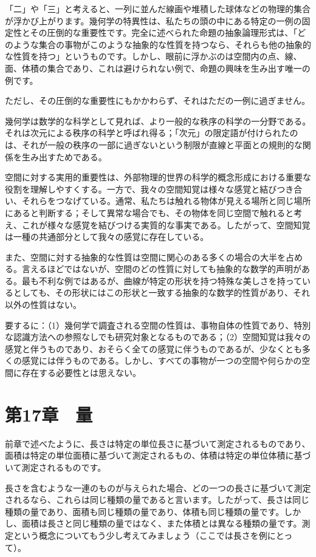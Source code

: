 \documentclass[a4paper,11pt,openany]{ltjsbook}
\begin{document}
「二」や「三」と考えると、一列に並んだ線画や堆積した球体などの物理的集合が浮かび上がります。幾何学の特異性は、私たちの頭の中にある特定の一例の固定性とその圧倒的な重要性です。完全に述べられた命題の抽象論理形式は、「どのような集合の事物がこのような抽象的な性質を持つなら、それらも他の抽象的な性質を持つ」というものです。しかし、眼前に浮かぶのは空間内の点、線、面、体積の集合であり、これは避けられない例で、命題の興味を生み出す唯一の例です。

ただし、その圧倒的な重要性にもかかわらず、それはただの一例に過ぎません。

幾何学は数学的な科学として見れば、より一般的な秩序の科学の一分野である。それは次元による秩序の科学と呼ばれ得る；「次元」の限定語が付けられたのは、それが一般の秩序の一部に過ぎないという制限が直線と平面との規則的な関係を生み出すためである。

空間に対する実用的重要性は、外部物理的世界の科学的概念形成における重要な役割を理解しやすくする。一方で、我々の空間知覚は様々な感覚と結びつき合い、それらをつなげている。通常、私たちは触れる物体が見える場所と同じ場所にあると判断する；そして異常な場合でも、その物体を同じ空間で触れると考え、これが様々な感覚を結びつける実質的な事実である。したがって、空間知覚は一種の共通部分として我々の感覚に存在している。

また、空間に対する抽象的な性質は空間に関心のある多くの場合の大半を占める。言えるほどではないが、空間のどの性質に対しても抽象的な数学的声明がある。最も不利な例ではあるが、曲線が特定の形状を持つ特殊な美しさを持っているとしても、その形状にはこの形状と一致する抽象的な数学的性質があり、それ以外の性質はない。

要するに：（1）幾何学で調査される空間の性質は、事物自体の性質であり、特別な認識方法への参照なしでも研究対象となるものである；（2）空間知覚は我々の感覚と伴うものであり、おそらく全ての感覚に伴うものであるが、少なくとも多くの感覚には伴うものである。しかし、すべての事物が一つの空間や何らかの空間に存在する必要性とは思えない。

\chapter{第17章　量}

前章で述べたように、長さは特定の単位長さに基づいて測定されるものであり、面積は特定の単位面積に基づいて測定されるもの、体積は特定の単位体積に基づいて測定されるものです。

長さを含むような一連のものが与えられた場合、どの一つの長さに基づいて測定されるなら、これらは同じ種類の量であると言います。したがって、長さは同じ種類の量であり、面積も同じ種類の量であり、体積も同じ種類の量です。しかし、面積は長さと同じ種類の量ではなく、また体積とは異なる種類の量です。測定という概念についてもう少し考えてみましょう（ここでは長さを例にとって）。
\end{document}
